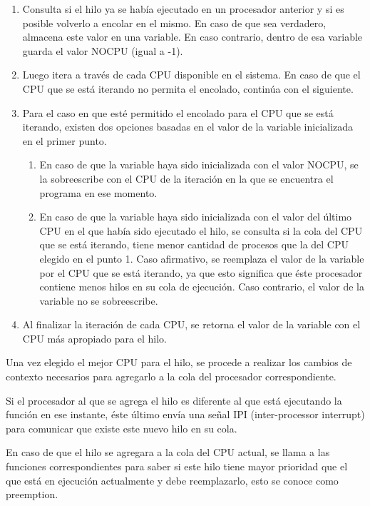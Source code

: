 \begin{enumerate}
    \item Consulta si el hilo ya se había ejecutado en un procesador anterior y si es posible volverlo a encolar en el mismo. En caso de que sea verdadero, almacena este valor en una variable. En caso contrario, dentro de esa variable guarda el valor NOCPU (igual a -1).
    \item Luego itera a través de cada CPU disponible en el sistema. En caso de que el CPU que se está iterando no permita el encolado, continúa con el siguiente.
    \item Para el caso en que esté permitido el encolado para el CPU que se está iterando, existen dos opciones basadas en el valor de la variable inicializada en el primer punto.
    \begin{enumerate}
        \item En caso de que la variable haya sido inicializada con el valor NOCPU, se la sobreescribe con el CPU de la iteración en la que se encuentra el programa en ese momento.
        \item En caso de que la variable haya sido inicializada con el valor del último CPU en el que había sido ejecutado el hilo, se consulta si la cola del CPU que se está iterando, tiene menor cantidad de procesos que la del CPU elegido en el punto 1. Caso afirmativo, se reemplaza el valor de la variable por el CPU que se está iterando, ya que esto significa que éste procesador contiene menos hilos en su cola de ejecución. Caso contrario, el valor de la variable no se sobreescribe.
    \end{enumerate}
    \item Al finalizar la iteración de cada CPU, se retorna el valor de la variable con el CPU más apropiado para el hilo.
\end{enumerate}

Una vez elegido el mejor CPU para el hilo, se procede a realizar los cambios de contexto necesarios para agregarlo a la cola del procesador correspondiente.

Si el procesador al que se agrega el hilo es diferente al que está ejecutando la función en ese instante, éste último envía una señal IPI (inter-processor interrupt) para comunicar que existe este nuevo hilo en su cola.

En caso de que el hilo se agregara a la cola del CPU actual, se llama a las funciones correspondientes para saber si este hilo tiene mayor prioridad que el que está en ejecución actualmente y debe reemplazarlo, esto se conoce como preemption.

